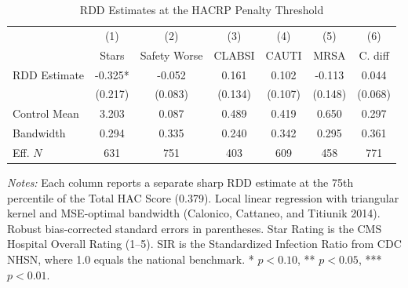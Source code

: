 \begin{table}[t]
\centering
\caption{RDD Estimates at the HACRP Penalty Threshold}
\label{tab:rdd_main}
\begin{threeparttable}
\footnotesize
\begin{tabular}{lcccccc}
\toprule
& (1) & (2) & (3) & (4) & (5) & (6) \\
& Stars & Safety Worse & CLABSI & CAUTI & MRSA & C. diff \\
\midrule
RDD Estimate & -0.325* & -0.052 & 0.161 & 0.102 & -0.113 & 0.044 \\
& (0.217) & (0.083) & (0.134) & (0.107) & (0.148) & (0.068) \\
\addlinespace
Control Mean & 3.203 & 0.087 & 0.489 & 0.419 & 0.650 & 0.297 \\
Bandwidth & 0.294 & 0.335 & 0.240 & 0.342 & 0.295 & 0.361 \\
Eff. $N$ & 631 & 751 & 403 & 609 & 458 & 771 \\
\bottomrule
\end{tabular}
\begin{tablenotes}
\footnotesize
\item \textit{Notes:} Each column reports a separate sharp RDD estimate at the 75th percentile of the Total HAC Score (0.379). Local linear regression with triangular kernel and MSE-optimal bandwidth (Calonico, Cattaneo, and Titiunik 2014). Robust bias-corrected standard errors in parentheses. Star Rating is the CMS Hospital Overall Rating (1--5). SIR is the Standardized Infection Ratio from CDC NHSN, where 1.0 equals the national benchmark. * $p < 0.10$, ** $p < 0.05$, *** $p < 0.01$.
\end{tablenotes}
\end{threeparttable}
\end{table}
